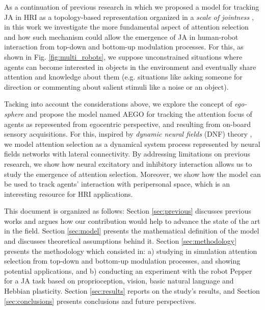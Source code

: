 \documentclass[letterpaper, 10 pt, conference]{ieeeconf}  %
\begin{document}
	As a continuation of previous research in which we proposed a model for tracking JA in HRI as a topology-based representation organized in a \textit{scale of jointness} \cite{chame2023top}, in this work we investigate the more fundamental aspect of attention selection and how such mechanism could allow the emergence of JA in human-robot interaction from top-down and bottom-up modulation processes. For this, as shown in Fig. \ref{fig:multi_robots}, we suppose unconstrained situations where agents can become interested in objects in the environment and eventually share attention and knowledge about them (e.g. situations like asking someone for direction or commenting about salient stimuli like a noise or an object). 
	
	Tacking into account the considerations above, we explore the concept of \textit{ego-sphere} \cite{albus1991} and propose the model named AEGO for tracking the attention focus of agents as represented from egocentric perspective, and resulting from on-board sensory acquisitions. For this, inspired by \textit{dynamic neural fields} (DNF) theory \cite{amari1977}, we model attention selection as a dynamical system process represented by neural fields networks with lateral connectivity. By addressing limitations on previous research, we show how neural excitatory and inhibitory interaction allows us to study the emergence of attention selection. Moreover, we show how the model can be used to track agents' interaction with peripersonal space, which is an interesting resource for HRI applications. 
	
	  	  
	This document is organized as follows: Section \ref{sec:previous} discusses previous works and argues how our contribution would help to advance the state of the art in the field. Section \ref{sec:model} presents the mathematical definition of the model and discusses theoretical assumptions behind it. Section \ref{sec:methodology} presents the methodology which consisted in: a) studying in simulation attention selection from top-down and bottom-up modulation processes, and showing potential applications, and b) conducting an experiment with the robot Pepper for a JA task based on proprioception, vision, basic natural language and Hebbian plasticity. Section \ref{sec:results} reports on the study’s results, and Section \ref{sec:conclusions} presents conclusions and future perspectives.
	  
\end{document}
